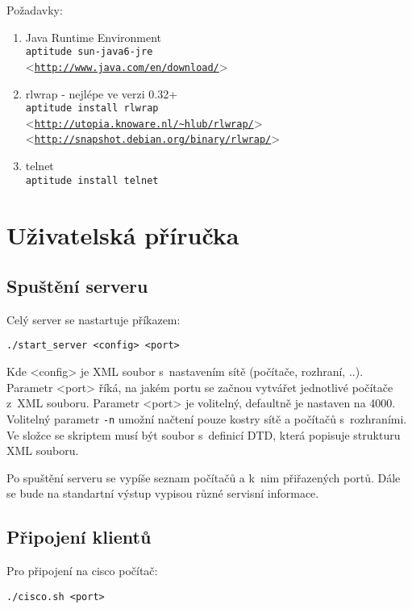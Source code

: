 \documentclass[11pt,twoside,a4paper]{book}
\let\oldUrl\url
\renewcommand\url[1]{<\texttt{\oldUrl{#1}}>}
\begin{document}
Požadavky:
\begin{enumerate}
\item Java Runtime Environment\\
      \verb|aptitude sun-java6-jre|\\
      \url{http://www.java.com/en/download/}
\item rlwrap - nejlépe ve verzi 0.32+\\
    \verb|aptitude install rlwrap|\\
    \url{http://utopia.knoware.nl/\~hlub/rlwrap/}\\
    \url{http://snapshot.debian.org/binary/rlwrap/}
\item telnet\\
    \verb|aptitude install telnet|
\end{enumerate}





\section{Uživatelská příručka} 

\subsection{Spuštění serveru} 

Celý server se nastartuje příkazem:
\begin{verbatim}
./start_server <config> <port> 
\end{verbatim} 

Kde <config> je XML soubor s~nastavením sítě (počítače, rozhraní, ..).
Parametr <port> říká, na jakém portu se začnou vytvářet jednotlivé počítače z~XML souboru.
Parametr <port> je volitelný, defaultně je nastaven na 4000.
Volitelný parametr \verb|-n| umožní načtení pouze kostry sítě a počítačů s~rozhraními.
Ve složce se skriptem musí být soubor s~definicí DTD, která popisuje strukturu XML souboru.

Po spuštění serveru se vypíše seznam počítačů a k~nim přiřazených portů.
Dále se bude na standartní výstup vypisou různé servisní informace.

\subsection{Připojení klientů} 
Pro připojení na cisco počítač:
\begin{verbatim}
./cisco.sh <port> 
\end{verbatim} 
\end{document}
